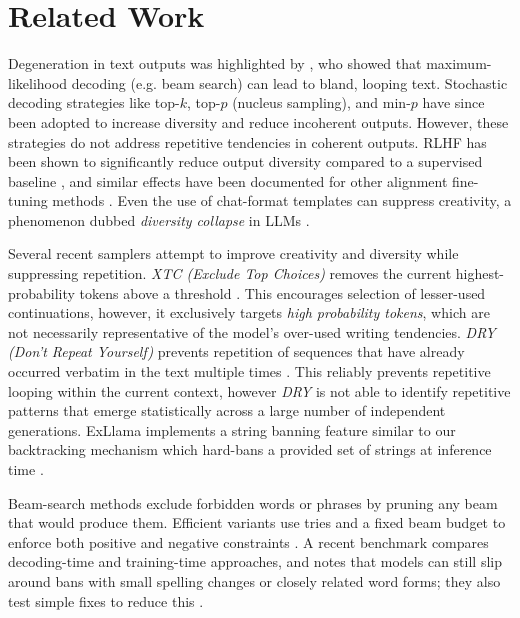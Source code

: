 \documentclass[11pt]{article}
\begin{document}
\section{Related Work}

Degeneration in text outputs was highlighted by \citet{holtzman-etal-2020-curious}, who showed that maximum-likelihood decoding (e.g. beam search) can lead to bland, looping text. Stochastic decoding strategies like top-$k$, top-$p$ (nucleus sampling), and min-$p$ \citep{nguyen2025turningheatminpsampling} have since been adopted to increase diversity and reduce incoherent outputs. However, these strategies do not address repetitive tendencies in coherent outputs. RLHF has been shown to significantly reduce output diversity compared to a supervised baseline \citep{kirk-etal-2024-rlhf}, and similar effects have been documented for other alignment fine-tuning methods \citep{omahony-etal-2024-mode, murthy-etal-2024-alignment}. Even the use of chat-format templates can suppress creativity, a phenomenon dubbed \textit{diversity collapse} in LLMs \citep{yun-etal-2025-diversity}.

Several recent samplers attempt to improve creativity and diversity while suppressing repetition. \emph{XTC (Exclude Top Choices)} removes the current highest-probability tokens above a threshold \citep{weidmann2024xtc}. This encourages selection of lesser-used continuations, however, it exclusively targets \textit{high probability tokens}, which are not necessarily representative of the model's over-used writing tendencies. \emph{DRY (Don’t Repeat Yourself)} prevents repetition of sequences that have already occurred verbatim in the text multiple times \citep{weidmann2024dry}. This reliably prevents repetitive looping within the current context, however \textit{DRY} is not able to identify repetitive patterns that emerge statistically across a large number of independent generations. ExLlama implements a string banning feature similar to our backtracking mechanism which hard-bans a provided set of strings at inference time \citep{turboderp_exllamav2_0_3_0}.   


Beam-search methods exclude forbidden words or phrases by pruning any beam that would produce them. Efficient variants use tries and a fixed beam budget to enforce both positive and negative constraints \citep{hu2019improved}. A recent benchmark compares decoding-time and training-time approaches, and notes that models can still slip around bans with small spelling changes or closely related word forms; they also test simple fixes to reduce this \citep{jon2023negative}.
\end{document}
